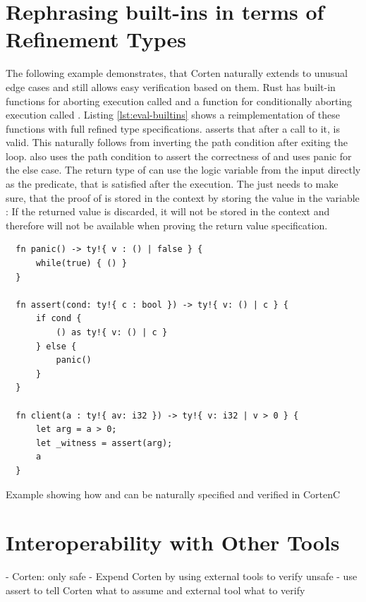\documentclass[twoside, english]{sdqthesis}
\theoremstyle{definition}
\begin{document}
\section{Rephrasing built-ins in terms of Refinement Types}

The following example demonstrates, that Corten naturally extends to unusual edge cases and still allows easy verification based on them.
Rust has built-in functions for aborting execution \- called  \- and a function for conditionally aborting execution \- called . Listing \ref{lst:eval-builtins} shows a reimplementation of these functions with full refined type specifications. 
 asserts that after a call to it,  is valid. This naturally follows from inverting the path condition after exiting the loop. 
 also uses the path condition to assert the correctness of  and uses panic for the else case. The return type of  can use the logic variable  from the input directly as the predicate, that is satisfied after the execution.
The  just needs to make sure, that the proof of  is stored in the context by storing the value in the variable : If the returned value is discarded, it will not be stored in the context and therefore will not be available when proving the return value specification.


\begin{listing}[ht]
  \begin{verbatim}
  fn panic() -> ty!{ v : () | false } {
      while(true) { () }
  }

  fn assert(cond: ty!{ c : bool }) -> ty!{ v: () | c } {
      if cond {
          () as ty!{ v: () | c }
      } else {
          panic()
      }
  }

  fn client(a : ty!{ av: i32 }) -> ty!{ v: i32 | v > 0 } {
      let arg = a > 0;
      let _witness = assert(arg);
      a
  }
  \end{verbatim}
  \caption{Example showing how  and  can be naturally specified and verified in CortenC}
  \label{lst:eval-builtins}
\end{listing}


\section{Interoperability with Other Tools}

- Corten: only safe
- Expend Corten by using external tools to verify unsafe
- use assert to tell Corten what to assume and external tool what to verify
\end{document}
